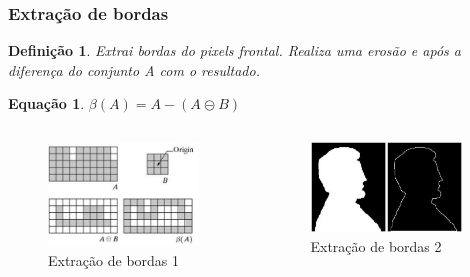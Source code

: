 \documentclass[aspectratio=169]{beamer}
\theoremstyle{Definition}
\newtheorem{defn}{Defini\c c\~ao}
\newtheorem{eq}[theorem]{Equa\c c\~ao}
\begin{document}
\begin{frame}
	\frametitle{Extração de bordas}
	
	\begin{defn}
    	Extrai bordas do pixels frontal. Realiza uma erosão e após a diferença do conjunto A com o resultado.
	\end{defn}
	
	\begin{eq}
    	$ \beta(A) = A  - (A \circleddash B)$ 
	\end{eq}
	
	\begin{columns}
		\begin{column}{0.5\textwidth}
			\begin{figure}[h]
	  		 	\includegraphics[width=4cm, height=0.25\paperheight]{imagens/border_ex1}
				\caption{Extração de bordas 1}\label{figLogical}
			\end{figure}
		\end{column}
		\begin{column}{0.5\textwidth}
			\begin{figure}[h]
			   	\includegraphics[width=4cm, height=0.25\paperheight]{imagens/border_ex2}
				\caption{Extração de bordas 2}\label{figLogical}
			\end{figure}
		\end{column}
	\end{columns}
	
\end{frame}
\end{document}
